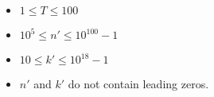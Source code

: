 \begin{itemize}
\tightlist
\item $1 \leq T \leq 100$
\item $10^5 \leq n' \leq 10^{100} - 1$
\item $10 \leq k' \leq 10^{18} - 1$
\item $n'$ and $k'$ do not contain leading zeros.
\end{itemize}
